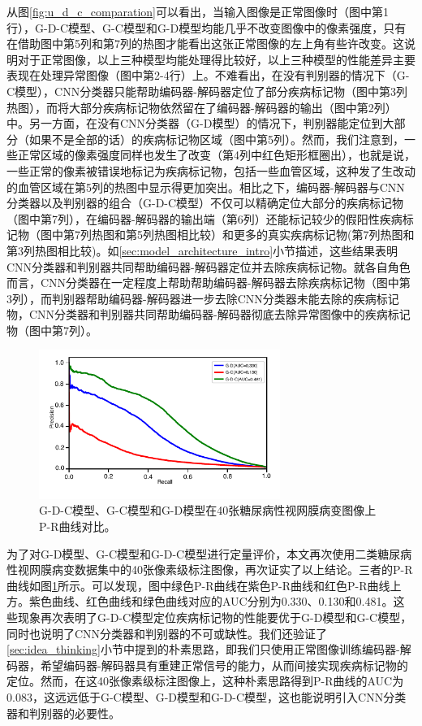 从图\ref{fig:u_d_c_comparation}可以看出，当输入图像是正常图像时（图中第1行），G-D-C模型、G-C模型和G-D模型均能几乎不改变图像中的像素强度，只有在借助图中第5列和第7列的热图才能看出这张正常图像的左上角有些许改变。这说明对于正常图像，以上三种模型均能处理得比较好，以上三种模型的性能差异主要表现在处理异常图像（图中第2-4行）上。不难看出，在没有判别器的情况下（G-C模型），CNN分类器只能帮助编码器-解码器定位了部分疾病标记物（图中第3列热图），而将大部分疾病标记物依然留在了编码器-解码器的输出（图中第2列）中。另一方面，在没有CNN分类器（G-D模型）的情况下，判别器能定位到大部分（如果不是全部的话）的疾病标记物区域（图中第5列）。然而，我们注意到，一些正常区域的像素强度同样也发生了改变（第4列中红色矩形框圈出），也就是说，一些正常的像素被错误地标记为疾病标记物，包括一些血管区域，这种发了生改动的血管区域在第5列的热图中显示得更加突出。相比之下，编码器-解码器与CNN分类器以及判别器的组合（G-D-C模型）不仅可以精确定位大部分的疾病标记物（图中第7列），在编码器-解码器的输出端（第6列）还能标记较少的假阳性疾病标记物（图中第7列热图和第5列热图相比较）和更多的真实疾病标记物(第7列热图和第3列热图相比较)。如\ref{sec:model_architecture_intro}小节描述，这些结果表明CNN分类器和判别器共同帮助编码器-解码器定位并去除疾病标记物。就各自角色而言，CNN分类器在一定程度上帮助帮助编码器-解码器去除疾病标记物（图中第3列），而判别器帮助编码器-解码器进一步去除CNN分类器未能去除的疾病标记物，CNN分类器和判别器共同帮助编码器-解码器彻底去除异常图像中的疾病标记物（图中第7列）。
\begin{figure}[h]
	\centering
	\includegraphics[width=0.7\textwidth]{figure/pr_cureve_u_d_u_c_u_d_c_components.pdf}
	\caption[G-D-C模型、G-C模型和G-D模型P-R曲线对比]{G-D-C模型、G-C模型和G-D模型在40张糖尿病性视网膜病变图像上P-R曲线对比。}
	\label{fig:u_d_c_comparation_pr_curve}
\end{figure}

为了对G-D模型、G-C模型和G-D-C模型进行定量评价，本文再次使用二类糖尿病性视网膜病变数据集中的40张像素级标注图像，再次证实了以上结论。三者的P-R曲线如图\ref{fig:u_d_c_comparation_pr_curve}所示。可以发现，图中绿色P-R曲线在紫色P-R曲线和红色P-R曲线上方。紫色曲线、红色曲线和绿色曲线对应的AUC分别为0.330、0.130和0.481。这些现象再次表明了G-D-C模型定位疾病标记物的性能要优于G-D模型和G-C模型，同时也说明了CNN分类器和判别器的不可或缺性。我们还验证了\ref{sec:idea_thinking}小节中提到的朴素思路，即我们只使用正常图像训练编码器-解码器，希望编码器-解码器具有重建正常信号的能力，从而间接实现疾病标记物的定位。然而，在这40张像素级标注图像上，这种朴素思路得到P-R曲线的AUC为0.083，这远远低于G-C模型、G-D模型和G-D-C模型，这也能说明引入CNN分类器和判别器的必要性。

